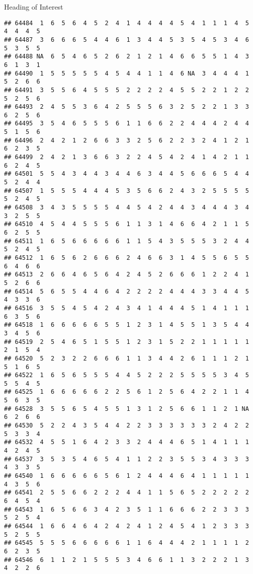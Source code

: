 \documentclass[
  ignorenonframetext,
]{beamer}
\begin{document}
\begin{frame}[fragile]{Heading of Interest}
\begin{verbatim}
## 64484  1  6  5  6  4  5  2  4  1  4  4  4  4  5  4  1  1  1  4  5  4  4  4  5
## 64487  3  6  6  6  5  4  4  6  1  3  4  4  5  3  5  4  5  3  4  6  5  3  5  5
## 64488 NA  6  5  4  6  5  2  6  2  1  2  1  4  6  6  5  5  1  4  3  6  1  3  1
## 64490  1  5  5  5  5  5  4  5  4  4  1  1  4  6 NA  3  4  4  4  1  5  2  6  6
## 64491  3  5  5  6  4  5  5  5  2  2  2  2  4  5  5  2  2  1  2  2  5  2  5  6
## 64493  2  4  5  5  3  6  4  2  5  5  5  6  3  2  5  2  2  1  3  3  6  2  5  6
## 64495  3  5  4  6  5  5  5  6  1  1  6  6  2  2  4  4  4  2  4  4  5  1  5  6
## 64496  2  4  2  1  2  6  6  3  3  2  5  6  2  2  3  2  4  1  2  1  6  2  3  5
## 64499  2  4  2  1  3  6  6  3  2  2  4  5  4  2  4  1  4  2  1  1  6  2  4  5
## 64501  5  5  4  3  4  4  3  4  4  6  3  4  4  5  6  6  6  5  4  4  5  2  4  4
## 64507  1  5  5  5  4  4  4  5  3  5  6  6  2  4  3  2  5  5  5  5  5  2  4  5
## 64508  3  4  3  5  5  5  5  4  4  5  4  2  4  4  3  4  4  4  3  4  3  2  5  5
## 64510  4  5  4  4  5  5  5  6  1  1  3  1  4  6  6  4  2  1  1  5  6  2  5  5
## 64511  1  6  5  6  6  6  6  6  1  1  5  4  3  5  5  5  3  2  4  4  5  2  4  5
## 64512  1  6  5  6  2  6  6  6  2  4  6  6  3  1  4  5  5  6  5  5  6  4  6  6
## 64513  2  6  6  4  6  5  6  4  2  4  5  2  6  6  6  1  2  2  4  1  5  2  6  6
## 64514  5  6  5  5  4  4  6  4  2  2  2  2  4  4  4  3  3  4  4  5  4  3  3  6
## 64516  3  5  5  4  5  4  2  4  3  4  1  4  4  4  5  1  4  1  1  1  6  3  5  6
## 64518  1  6  6  6  6  6  5  5  1  2  3  1  4  5  5  1  3  5  4  4  3  4  5  6
## 64519  2  5  4  6  5  1  5  5  1  2  3  1  5  2  2  1  1  1  1  1  2  1  5  4
## 64520  5  2  3  2  2  6  6  6  1  1  3  4  4  2  6  1  1  1  2  1  5  1  6  5
## 64522  1  6  5  6  5  5  5  4  4  5  2  2  2  5  5  5  5  3  4  5  5  5  4  5
## 64525  1  6  6  6  6  6  2  2  5  6  1  2  5  6  4  2  2  1  1  4  5  6  3  5
## 64528  3  5  5  6  5  4  5  5  1  3  1  2  5  6  6  1  1  2  1 NA  6  2  6  6
## 64530  5  2  2  4  3  5  4  4  2  2  3  3  3  3  3  3  2  4  2  2  5  3  3  4
## 64532  4  5  5  1  6  4  2  3  3  2  4  4  4  6  5  1  4  1  1  1  4  2  4  5
## 64537  3  5  3  5  4  6  5  4  1  1  2  2  3  5  5  3  4  3  3  3  4  3  3  5
## 64540  1  6  6  6  6  6  5  6  1  2  4  4  4  6  4  1  1  1  1  1  4  3  5  6
## 64541  2  5  5  6  6  2  2  2  4  4  1  1  5  6  5  2  2  2  2  2  6  4  5  4
## 64543  1  6  5  6  6  3  4  2  3  5  1  1  6  6  6  2  2  3  3  3  5  2  5  4
## 64544  1  6  6  4  6  4  2  4  2  4  1  2  4  5  4  1  2  3  3  3  5  2  5  5
## 64545  5  5  5  6  6  6  6  6  1  1  6  4  4  4  2  1  1  1  1  2  6  2  3  5
## 64546  6  1  1  2  1  5  5  5  3  4  6  6  1  1  3  2  2  2  1  3  4  2  2  6

\end{verbatim}
\end{frame}
\end{document}

